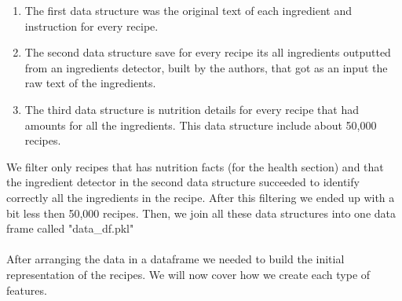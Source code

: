 \documentclass[]{article}
\begin{document}
\begin{enumerate}
	\item The first data structure was the original text of each ingredient and instruction for every recipe. 

	\item The second data structure save for every recipe its all ingredients outputted from an ingredients detector, built by the authors, that got as an input the raw text of the ingredients. 

	\item The third data structure is nutrition details for every recipe that had amounts for all the ingredients. This data structure include about 50,000 recipes.
\end{enumerate}  

We filter only recipes that has nutrition facts (for the health section) and that the ingredient detector in the second data structure succeeded to identify correctly all the ingredients in the recipe. After this filtering we ended up with a bit less then 50,000 recipes. Then, we join all these data structures into one data frame called "data\_df.pkl" \\\\

After arranging the data in a dataframe we needed to build the initial representation of the recipes. We will now cover how we create each type of features.
\end{document}
